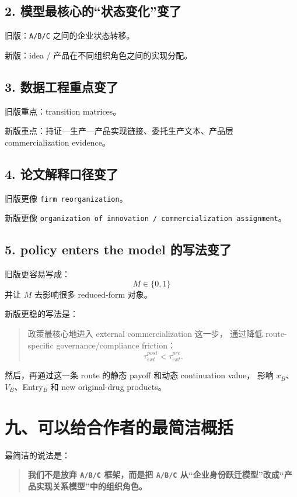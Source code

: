 \documentclass[12pt]{ctexart}
\begin{document}
\subsection*{2. 模型最核心的“状态变化”变了}

旧版：\texttt{A/B/C} 之间的企业状态转移。

新版：idea / 产品在不同组织角色之间的实现分配。

\subsection*{3. 数据工程重点变了}

旧版重点：transition matrices。

新版重点：持证—生产—产品实现链接、委托生产文本、产品层 commercialization evidence。

\subsection*{4. 论文解释口径变了}

旧版更像 \texttt{firm reorganization}。

新版更像 \texttt{organization of innovation / commercialization assignment}。

\subsection*{5. policy enters the model 的写法变了}

旧版更容易写成：
\[
M \in \{0,1\}
\]
并让 \(M\) 去影响很多 reduced-form 对象。

新版更稳的写法是：

\begin{quote}
政策最核心地进入 external commercialization 这一步，
通过降低 route-specific governance/compliance friction：
\[
\tau_{ext}^{post}<\tau_{ext}^{pre}.
\]
\end{quote}

然后，再通过这一条 route 的静态 payoff 和动态 continuation value，
影响 \(x_B\)、\(V_B\)、Entry\(_B\) 和 new original-drug products。

\section{九、可以给合作者的最简洁概括}

最简洁的说法是：

\begin{quote}
\textbf{我们不是放弃 \texttt{A/B/C} 框架，而是把 \texttt{A/B/C}
从“企业身份跃迁模型”改成“产品实现关系模型”中的组织角色。}
\end{quote}
\end{document}

